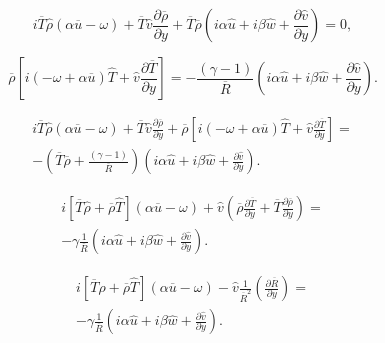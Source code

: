 \begin{equation*}
i
\overline{T}
\hat{\rho}
(\alpha\overline{u}- \omega) 
+
\overline{T}
\hat{v}
\frac{\partial \overline{\rho}}{\partial y} 
+
\overline{T}
\overline{\rho}
\left(
i
\alpha
\hat{u}
+
i
\beta
\hat{w}
+
\frac{\partial \hat{v}}{\partial y}
\right)
=
0
,
\end{equation*} 

\begin{equation*} 
\overline{\rho}
\left[
    i
    \left(
    -
    \omega 
    +
    \alpha 
    \overline{u}
    \right)
    \hat{T}
    +
    \hat{v}
    \frac{\partial \overline{T} }{\partial y}
\right]
=
-
\frac{(\gamma-1)}{\overline{R}}
\left(
i
\alpha
\hat{u}
+
i
\beta
\hat{w}
+
\frac{\partial \hat{v}}{\partial y}
\right)
.
\end{equation*} 


\begin{equation*} 
\begin{split} 
i
\overline{T}
\hat{\rho}
(\alpha\overline{u}- \omega) 
+
\overline{T}
\hat{v}
\frac{\partial \overline{\rho}}{\partial y} 
+
\overline{\rho}
\left[
    i
    \left(
    -
    \omega 
    +
    \alpha 
    \overline{u}
    \right)
    \hat{T}
    +
    \hat{v}
    \frac{\partial \overline{T} }{\partial y}
\right]
=
\\
-
\left(
\overline{T}
\overline{\rho}
+
\frac{(\gamma-1)}{\overline{R}}
\right)
\left(
i
\alpha
\hat{u}
+
i
\beta
\hat{w}
+
\frac{\partial \hat{v}}{\partial y}
\right)
.
\end{split} 
\end{equation*} 

\begin{equation*} 
\begin{split} 
i
\left[
\overline{T}
\hat{\rho}
+
\overline{\rho}
\hat{T}
\right]
    \left(
    \alpha 
    \overline{u}
    -
    \omega 
    \right)
+
\hat{v}
\left(
    \overline{\rho}
    \frac{\partial \overline{T}}{\partial y} 
    +
    \overline{T}
    \frac{\partial \overline{\rho}}{\partial y} 
\right)
=
\\
-
\gamma
\frac{1 }{\overline{R}} 
\left(
i
\alpha
\hat{u}
+
i
\beta
\hat{w}
+
\frac{\partial \hat{v}}{\partial y}
\right)
.
\end{split} 
\end{equation*} 

\begin{equation*} 
\begin{split} 
i
\left[
\overline{T}
\hat{\rho}
+
\overline{\rho}
\hat{T}
\right]
    \left(
    \alpha 
    \overline{u}
    -
    \omega 
    \right)
-
\hat{v}
\frac{1}{\overline{R}^2} 
\left(
    \frac{\partial \overline{R}}{\partial y} 
\right)
=
\\
-
\gamma
\frac{1 }{\overline{R}} 
\left(
i
\alpha
\hat{u}
+
i
\beta
\hat{w}
+
\frac{\partial \hat{v}}{\partial y}
\right)
.
\end{split} 
\end{equation*} 


